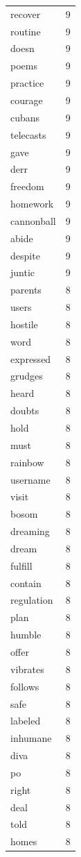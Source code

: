 \begin{tabular}{lr}
recover & 9 \\
routine & 9 \\
doesn & 9 \\
poems & 9 \\
practice & 9 \\
courage & 9 \\
cubans & 9 \\
telecasts & 9 \\
gave & 9 \\
derr & 9 \\
freedom & 9 \\
homework & 9 \\
cannonball & 9 \\
abide & 9 \\
despite & 9 \\
juntic & 9 \\
parents & 8 \\
users & 8 \\
hostile & 8 \\
word & 8 \\
expressed & 8 \\
grudges & 8 \\
heard & 8 \\
doubts & 8 \\
hold & 8 \\
must & 8 \\
rainbow & 8 \\
username & 8 \\
visit & 8 \\
bosom & 8 \\
dreaming & 8 \\
dream & 8 \\
fulfill & 8 \\
contain & 8 \\
regulation & 8 \\
plan & 8 \\
humble & 8 \\
offer & 8 \\
vibrates & 8 \\
follows & 8 \\
safe & 8 \\
labeled & 8 \\
inhumane & 8 \\
diva & 8 \\
po & 8 \\
right & 8 \\
deal & 8 \\
told & 8 \\
homes & 8 \\

\end{tabular}
